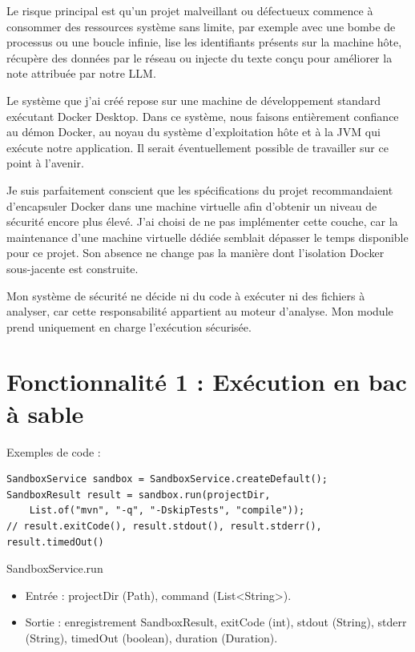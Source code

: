 \documentclass[11pt,a4paper]{article}
\begin{document}
Le risque principal est qu'un projet malveillant ou défectueux commence à consommer des ressources système sans limite, par exemple avec une bombe de processus ou une boucle infinie, lise les identifiants présents sur la machine hôte, récupère des données par le réseau ou injecte du texte conçu pour améliorer la note attribuée par notre LLM.

Le système que j'ai créé repose sur une machine de développement standard exécutant Docker Desktop. Dans ce système, nous faisons entièrement confiance au démon Docker, au noyau du système d'exploitation hôte et à la JVM qui exécute notre application. Il serait éventuellement possible de travailler sur ce point à l'avenir.

Je suis parfaitement conscient que les spécifications du projet recommandaient d'encapsuler Docker dans une machine virtuelle afin d'obtenir un niveau de sécurité encore plus élevé. J'ai choisi de ne pas implémenter cette couche, car la maintenance d'une machine virtuelle dédiée semblait dépasser le temps disponible pour ce projet. Son absence ne change pas la manière dont l'isolation Docker sous-jacente est construite.

Mon système de sécurité ne décide ni du code à exécuter ni des fichiers à analyser, car cette responsabilité appartient au moteur d'analyse. Mon module prend uniquement en charge l'exécution sécurisée.

\section{Fonctionnalité 1 : Exécution en bac à sable}

Exemples de code :

\begin{verbatim}
SandboxService sandbox = SandboxService.createDefault();
SandboxResult result = sandbox.run(projectDir,
    List.of("mvn", "-q", "-DskipTests", "compile"));
// result.exitCode(), result.stdout(), result.stderr(), result.timedOut()
\end{verbatim}

SandboxService.run

\begin{itemize}
    \item Entrée : projectDir (Path), command (List<String>).
    \item Sortie : enregistrement SandboxResult, exitCode (int), stdout (String), stderr (String), timedOut (boolean), duration (Duration).
\end{itemize}
\end{document}
